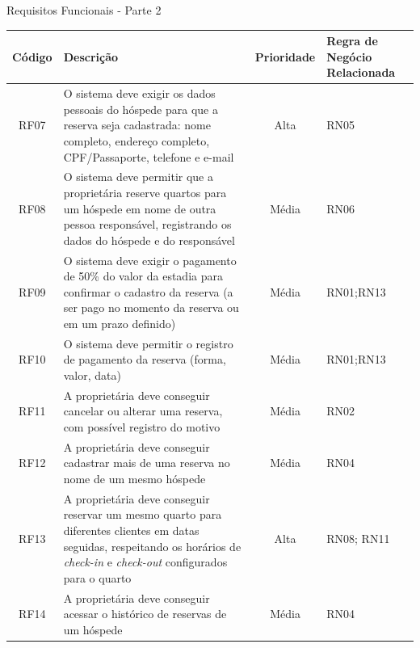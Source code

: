 \documentclass[
	12pt,				%
	openany,			%
	twoside,			%
	a4paper,			%
	english,			%
	french,				%
	spanish,			%
	brazil				%
	]{abntex2}
\begin{document}
\begin{quadro}[H]
	\caption{Requisitos Funcionais - Parte 2}
	\label{quadro_rf2}
	\begin{tabular}{|c|p{5cm}|c|p{4cm}|}
		\hline
		\textbf{Código} & \textbf{Descrição} & \textbf{Prioridade} & \textbf{Regra de Negócio Relacionada} \\ \hline
		RF07 & O sistema deve exigir os dados pessoais do hóspede para que a reserva seja cadastrada: nome completo, endereço completo, CPF/Passaporte, telefone e e-mail & Alta & RN05 \\ \hline
		RF08 & O sistema deve permitir que a proprietária reserve quartos para um hóspede em nome de outra pessoa responsável, registrando os dados do hóspede e do responsável & Média & RN06 \\ \hline
		RF09 & O sistema deve exigir o pagamento de 50\% do valor da estadia para confirmar o cadastro da reserva (a ser pago no momento da reserva ou em um prazo definido) & Média & RN01;RN13 \\ \hline
		RF10 & O sistema deve permitir o registro de pagamento da reserva (forma, valor, data) & Média & RN01;RN13 \\ \hline
		RF11 & A proprietária deve conseguir cancelar ou alterar uma reserva, com possível registro do motivo & Média & RN02 \\ \hline
		RF12 & A proprietária deve conseguir cadastrar mais de uma reserva no nome de um mesmo hóspede & Média & RN04 \\ \hline
		RF13 & A proprietária deve conseguir reservar um mesmo quarto para diferentes clientes em datas seguidas, respeitando os horários de \textit{check-in} e \textit{check-out} configurados para o quarto & Alta & RN08; RN11\\ \hline
		RF14 & A proprietária deve conseguir acessar o histórico de reservas de um hóspede & Média & RN04 \\ \hline
	\end{tabular}
\end{quadro}
\end{document}
